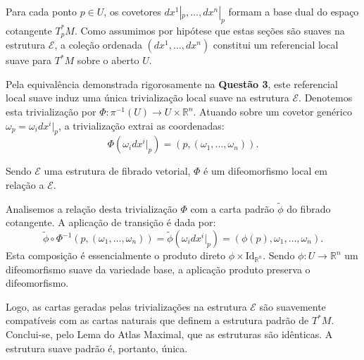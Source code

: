 {	Para cada ponto $p \in U$, os covetores $dx^1|_p, \dots, dx^n|_p$ formam a base dual do espaço cotangente $T_p^*M$. Como assumimos por hipótese que estas seções são suaves na estrutura $\mathcal{E}$, a coleção ordenada $(dx^1, \dots, dx^n)$ constitui um referencial local suave para $T^*M$ sobre o aberto $U$.
	
	Pela equivalência demonstrada rigorosamente na \textbf{Questão 3}, este referencial local suave induz uma única trivialização local suave na estrutura $\mathcal{E}$. Denotemos esta trivialização por $\Phi: \pi^{-1}(U) \to U \times \mathbb{R}^n$. Atuando sobre um covetor genérico $\omega_p = \omega_i dx^i|_p$, a trivialização extrai as coordenadas:
	\begin{equation*}
		\Phi(\omega_i dx^i|_p) = (p, (\omega_1, \dots, \omega_n)).
	\end{equation*}
	
	Sendo $\mathcal{E}$ uma estrutura de fibrado vetorial, $\Phi$ é um difeomorfismo local em relação a $\mathcal{E}$.
	
	Analisemos a relação desta trivialização $\Phi$ com a carta padrão $\tilde{\phi}$ do fibrado cotangente. A aplicação de transição é dada por:
	\begin{equation*}
		\tilde{\phi} \circ \Phi^{-1}(p, (\omega_1, \dots, \omega_n)) = \tilde{\phi}(\omega_i dx^i|_p) = (\phi(p), \omega_1, \dots, \omega_n).
	\end{equation*}
	Esta composição é essencialmente o produto direto $\phi \times \text{Id}_{\mathbb{R}^n}$. Sendo $\phi: U \to \mathbb{R}^n$ um difeomorfismo suave da variedade base, a aplicação produto preserva o difeomorfismo.
	
	Logo, as cartas geradas pelas trivializações na estrutura $\mathcal{E}$ são suavemente compatíveis com as cartas naturais que definem a estrutura padrão de $T^*M$. Conclui-se, pelo Lema do Atlas Maximal, que as estruturas são idênticas. A estrutura suave padrão é, portanto, única.
}
